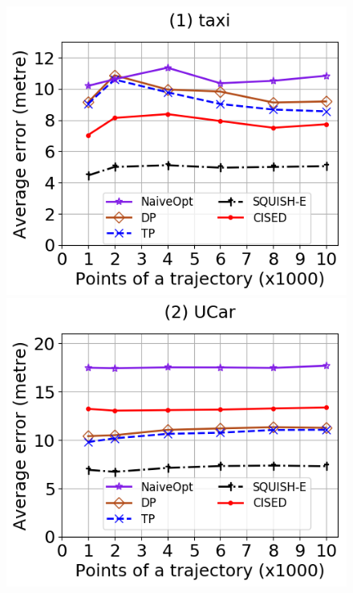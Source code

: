\begin{figure}[tb!]
	\centering
	\includegraphics[scale=0.315]{Figures/Exp-SED-error-size-taxi.png}\hspace{1ex}
	\includegraphics[scale=0.315]{Figures/Exp-SED-error-size-service.png} 	\hspace{1ex}

\end{figure}
